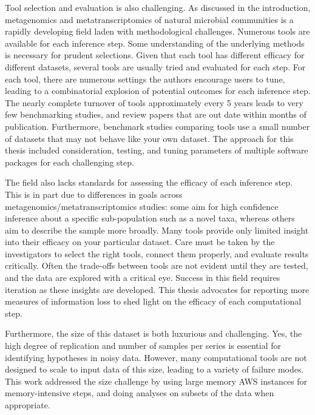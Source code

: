Tool selection and evaluation is also challenging.
As discussed in the introduction, metagenomics and metatranscriptomics of natural microbial communities is a rapidly developing field laden with methodological challenges.
Numerous tools are available for each inference step.
Some understanding of the underlying methods is necessary for prudent selections.
Given that each tool has different efficacy for different datasets, several tools are usually tried and evaluated for each step.
For each tool, there are numerous settings the authors encourage users to tune, leading to a combinatorial explosion of potential outcomes for each inference step.
The nearly complete turnover of tools approximately every 5 years leads to very few benchmarking studies, and review papers that are out date within months of publication.
Furthermore, benchmark studies comparing tools use a small number of datasets that may not behave like your own dataset.
The approach for this thesis included consideration, testing, and tuning parameters of multiple software packages for each challenging step.

The field also lacks standards for assessing the efficacy of each inference step.
This is in part due to differences in goals across metagenomics/metatranscriptomics studies: some aim for high confidence inference about a specific sub-population such as a novel taxa, whereas others aim to describe the sample more broadly.
Many tools provide only limited insight into their efficacy on your particular dataset.
Care must be taken by the investigators to select the right tools, connect them properly, and evaluate results critically.
Often the trade-offs between tools are not evident until they are tested, and the data are explored with a critical eye.
Success in this field requires iteration as these insights are developed.
This thesis advocates for reporting more measures of information loss to shed light on the efficacy of each computational step.

Furthermore, the size of this dataset is both luxurious and challenging.
Yes, the high degree of replication and number of samples per series is essential for identifying hypotheses in noisy data.
However, many computational tools are not designed to scale to input data of this size, leading to a variety of failure modes. %
This work addressed the size challenge by using large memory AWS instances for memory-intensive steps, and doing analyses on subsets of the data when appropriate.

